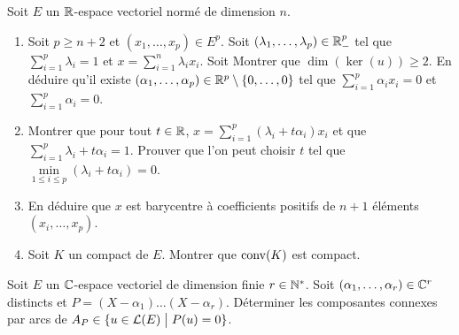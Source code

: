 \documentclass[12pt]{article}
\begin{document}
\begin{exercise}
	Soit $E$ un $\mathbb{R}$-espace vectoriel normé de dimension $n$.
	\begin{enumerate}
		\item Soit $p\geqslant n+2$ et $(x_{1},\dots,x_{p})\in E^{p}$. Soit $(\lambda_{1},\dots,\lambda_{p})\in\mathbb{R}_{-}^{p}$ tel que $\sum_{i=1}^{p}\lambda_{i}=1$ et $x=\sum_{i=1}^{n}\lambda_{i}x_{i}$. Soit 
		Montrer que $\dim(\ker(u))\geqslant 2$. En déduire qu'il existe $(\alpha_{1},\dots,\alpha_{p})\in\mathbb{R}^{p}\setminus\{0,\dots,0\}$ tel que $\sum_{i=1}^{p}\alpha_{i}x_{i}=0$ et $\sum_{i=1}^{p}\alpha_{i}=0$.
		
		\item Montrer que pour tout $t\in\mathbb{R}$, $x=\sum_{i=1}^{p}(\lambda_{i}+t\alpha_{i})x_{i}$ et que $\sum_{i=1}^{p}\lambda_{i}+t\alpha_{i}=1$. Prouver que l'on peut choisir $t$ tel que $\min\limits_{1\leqslant i\leqslant p}(\lambda_{i}+t\alpha_{i})=0$.
		
		\item En déduire que $x$ est barycentre à coefficients positifs de $n+1$ éléments $(x_{i},\dots,x_{p})$.
		
		\item Soit $K$ un compact de $E$. Montrer que $\operatorname{conv}(K)$ est compact.
	\end{enumerate}
\end{exercise}

\begin{exercise}
	Soit $E$ un $\mathbb{C}$-espace vectoriel de dimension finie $r\in\mathbb{N}^{*}$. Soit $(\alpha_{1},\dots,\alpha_{r})\in\mathbb{C}^{r}$ distincts et $P=(X-\alpha_{1})\dots(X-\alpha_{r})$. Déterminer les composantes connexes par arcs de $A_{P}\in\{u\in\mathcal{L}(E)\bigm| P(u)=0\}$.
\end{exercise}
\end{document}
